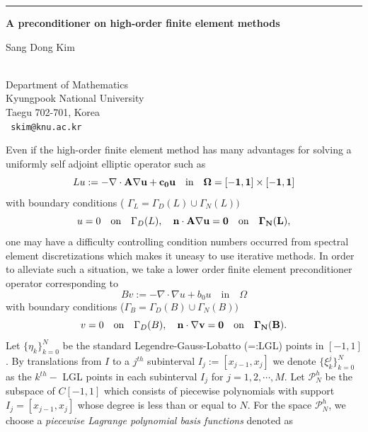 \documentclass[twosided]{report}
\def\BA{\bf{A}}
\def\bn{\bf{n}}
\def\CP{\mathcal{P}}
\newcommand{\gradt}{\nabla\cdot}
\begin{document}
\begin{center}

\rule{6in}{1pt}
\end{center}

\begin{center}
{\large			\label{kimsd}
{\bf
A preconditioner on high-order finite element methods
}

Sang Dong Kim} \\
Department of Mathematics \\
Kyungpook National University \\
Taegu 702-701, Korea
\\ {\tt
skim@knu.ac.kr
}
\end{center}


Even if the high-order finite  element method has many advantages
for solving a uniformly self adjoint elliptic operator such as
\begin{equation*}
   Lu:= -\gradt\BA \nabla u  + c_0 u
   \quad \text{in}\quad \Omega=[-1,1]\times[-1,1]
\end{equation*}
with boundary conditions ( $\Gamma_L = \Gamma_D(L) \cup \Gamma_N(L))$
\begin{equation*}
   u=0 \quad \text{on} \quad \Gamma_D(L), \quad
   \bn \cdot\BA\nabla u = 0 \quad \text{on}\quad \Gamma_N(L),
\end{equation*}
one may have a difficulty controlling  condition numbers occurred
from spectral element discretizations which makes it uneasy to use
iterative methods. In order to alleviate such a situation, we take
a lower order finite element preconditioner operator corresponding
to
\begin{equation*}\label{pre:oper}
   Bv:= -\gradt \nabla u  + b_0 u
   \quad \text{in}\quad \Omega
\end{equation*}
with boundary conditions  ($\Gamma_B = \Gamma_D(B) \cup \Gamma_N(B))$
\begin{equation*}\label{pre:bdry}
   v=0 \quad \text{on} \quad \Gamma_D(B), \quad
   \bn \cdot\nabla v =0\quad \text{on}\quad
   \Gamma_N(B).
\end{equation*}
Let $\{ \eta_k\}^N_{k=0}$ be the standard Legendre-Gauss-Lobatto
(=:LGL) points in $[-1, 1]$.  By translations from $I$ to a
$j^{th}$ subinterval $I_j:=[x_{j-1},x_j]$ we denote
$\{\xi_k^j\}^N_{k=0}$ as the $k^{th}-$ LGL points in each
subinterval $I_j$ for $j= 1, 2, \cdots, M$. Let $\CP^h_N$ be the
subspace of $C[-1,1]$ which consists of piecewise polynomials
 with support $I_j=[x_{j-1}, x_j]$ whose degree is less
than or equal to $N$.  For the space $\CP^h_N$, we choose a {\it
piecewise Lagrange polynomial  basis functions} denoted as
\end{document}
